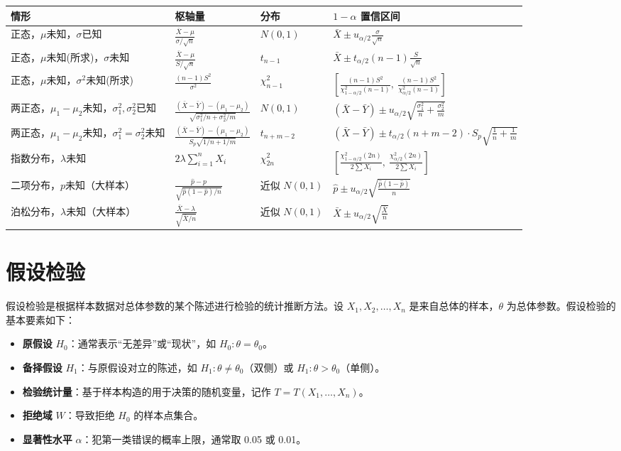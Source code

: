 \documentclass[a4paper]{ctexart}
\begin{document}
\begin{tabular}{llll}
\textbf{情形} & \textbf{枢轴量} & \textbf{分布} & \textbf{\(1-\alpha\) 置信区间} \\
\hline
正态，\(\mu\)未知，\(\sigma\)已知 & \(\frac{\bar{X}-\mu}{\sigma/\sqrt{n}}\) & \(N(0,1)\) & \(\bar{X} \pm u_{\alpha/2} \frac{\sigma}{\sqrt{n}}\) \\
正态，\(\mu\)未知(所求)，\(\sigma\)未知 & \(\frac{\bar{X}-\mu}{S/\sqrt{n}}\) & \(t_{n-1}\) & \(\bar{X} \pm t_{\alpha/2}(n-1) \frac{S}{\sqrt{n}}\) \\
正态，\(\mu\)未知，\(\sigma^2\)未知(所求) & \(\frac{(n-1)S^2}{\sigma^2}\) & \(\chi^2_{n-1}\) & \(\left[\frac{(n-1)S^2}{\chi^2_{1-\alpha/2}(n-1)},\ \frac{(n-1)S^2}{\chi^2_{\alpha/2}(n-1)}\right]\) \\
两正态，\(\mu_1-\mu_2\)未知，\(\sigma_1^2,\sigma_2^2\)已知 & \(\frac{(\bar{X}-\bar{Y})-(\mu_1-\mu_2)}{\sqrt{\sigma_1^2/n+\sigma_2^2/m}}\) & \(N(0,1)\) & \((\bar{X}-\bar{Y}) \pm u_{\alpha/2} \sqrt{\frac{\sigma_1^2}{n}+\frac{\sigma_2^2}{m}}\) \\
两正态，\(\mu_1-\mu_2\)未知，\(\sigma_1^2=\sigma_2^2\)未知 & \(\frac{(\bar{X}-\bar{Y})-(\mu_1-\mu_2)}{S_p\sqrt{1/n+1/m}}\) & \(t_{n+m-2}\) & \((\bar{X}-\bar{Y}) \pm t_{\alpha/2}(n+m-2) \cdot S_p\sqrt{\frac{1}{n}+\frac{1}{m}}\) \\
指数分布，\(\lambda\)未知 & \(2\lambda\sum\limits_{i=1}^n X_i\) & \(\chi^2_{2n}\) & \(\left[\frac{\chi^2_{1-\alpha/2}(2n)}{2\sum X_i},\ \frac{\chi^2_{\alpha/2}(2n)}{2\sum X_i}\right]\) \\
二项分布，\(p\)未知（大样本） & \(\frac{\hat{p}-p}{\sqrt{\hat{p}(1-\hat{p})/n}}\) & 近似 \(N(0,1)\) & \(\hat{p} \pm u_{\alpha/2} \sqrt{\frac{\hat{p}(1-\hat{p})}{n}}\) \\
泊松分布，\(\lambda\)未知（大样本） & \(\frac{\bar{X}-\lambda}{\sqrt{\bar{X}/n}}\) & 近似 \(N(0,1)\) & \(\bar{X} \pm u_{\alpha/2} \sqrt{\frac{\bar{X}}{n}}\) \\
\end{tabular}

\section{假设检验}

假设检验是根据样本数据对总体参数的某个陈述进行检验的统计推断方法。设 \(X_1, X_2, \ldots, X_n\) 是来自总体的样本，\(\theta\) 为总体参数。假设检验的基本要素如下：

\begin{itemize}
    \item \textbf{原假设} \(H_0\)：通常表示“无差异”或“现状”，如 \(H_0: \theta = \theta_0\)。
    \item \textbf{备择假设} \(H_1\)：与原假设对立的陈述，如 \(H_1: \theta \neq \theta_0\)（双侧）或 \(H_1: \theta > \theta_0\)（单侧）。
    \item \textbf{检验统计量}：基于样本构造的用于决策的随机变量，记作 \(T = T(X_1, \ldots, X_n)\)。
    \item \textbf{拒绝域} \(W\)：导致拒绝 \(H_0\) 的样本点集合。
    \item \textbf{显著性水平} \(\alpha\)：犯第一类错误的概率上限，通常取 0.05 或 0.01。
\end{itemize}
\end{document}
